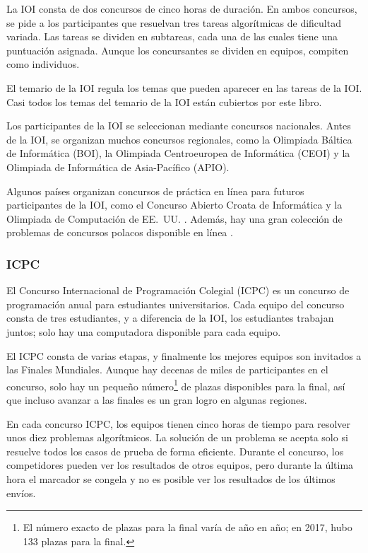 La IOI consta de dos concursos de cinco horas de duración.
En ambos concursos, se pide a los participantes que
resuelvan tres tareas algorítmicas de dificultad variada.
Las tareas se dividen en subtareas,
cada una de las cuales tiene una puntuación asignada.
Aunque los concursantes se dividen en equipos,
compiten como individuos.

El temario de la IOI \cite{iois} regula los temas
que pueden aparecer en las tareas de la IOI.
Casi todos los temas del temario de la IOI
están cubiertos por este libro.

Los participantes de la IOI se seleccionan mediante
concursos nacionales.
Antes de la IOI, se organizan muchos concursos regionales,
como la Olimpiada Báltica de Informática (BOI),
la Olimpiada Centroeuropea de Informática (CEOI)
y la Olimpiada de Informática de Asia-Pacífico (APIO).

Algunos países organizan concursos de práctica en línea
para futuros participantes de la IOI,
como el Concurso Abierto Croata de Informática \cite{coci}
y la Olimpiada de Computación de EE.\ UU. \cite{usaco}.
Además, hay una gran colección de problemas de concursos polacos
disponible en línea \cite{main}.

\subsubsection{ICPC}

El Concurso Internacional de Programación Colegial (ICPC)
es un concurso de programación anual para estudiantes universitarios.
Cada equipo del concurso consta de tres estudiantes,
y a diferencia de la IOI, los estudiantes trabajan juntos;
solo hay una computadora disponible para cada equipo.

El ICPC consta de varias etapas, y finalmente los
mejores equipos son invitados a las Finales Mundiales.
Aunque hay decenas de miles de participantes
en el concurso, solo hay un pequeño número\footnote{El número exacto de plazas para la final
varía de año en año; en 2017, hubo 133 plazas para la final.} de plazas disponibles para la final,
así que incluso avanzar a las finales
es un gran logro en algunas regiones.

En cada concurso ICPC, los equipos tienen cinco horas de tiempo para
resolver unos diez problemas algorítmicos.
La solución de un problema se acepta solo si resuelve
todos los casos de prueba de forma eficiente.
Durante el concurso, los competidores pueden ver los resultados de otros equipos,
pero durante la última hora el marcador se congela y no
es posible ver los resultados de los últimos envíos.

